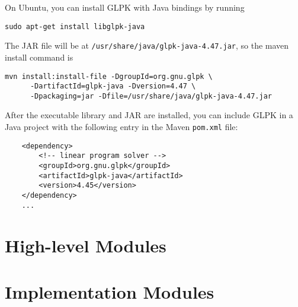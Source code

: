 \documentclass{article}
\begin{document}
On Ubuntu, you can install GLPK with Java bindings by running
\begin{verbatim}
sudo apt-get install libglpk-java
\end{verbatim}

The JAR file will be at \verb+/usr/share/java/glpk-java-4.47.jar+, so the maven
install command is

\begin{verbatim}
mvn install:install-file -DgroupId=org.gnu.glpk \
      -DartifactId=glpk-java -Dversion=4.47 \
      -Dpackaging=jar -Dfile=/usr/share/java/glpk-java-4.47.jar
\end{verbatim}

After the executable library and JAR are installed, you can include GLPK in a Java project with the following entry in the Maven \verb+pom.xml+ file:

\begin{verbatim}
    <dependency>
        <!-- linear program solver -->
        <groupId>org.gnu.glpk</groupId>
        <artifactId>glpk-java</artifactId>
        <version>4.45</version>
    </dependency>
    ...
\end{verbatim}

\section*{High-level Modules}

\section*{Implementation Modules}
\end{document}
